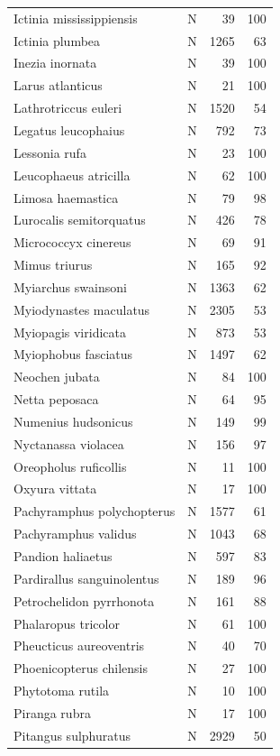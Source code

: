 \documentclass[
]{scrbook}
\begin{document}
\begin{table}
\begin{tabular}{llrr}
Ictinia mississippiensis & N & 39 & 100\\
Ictinia plumbea & N & 1265 & 63\\
\addlinespace
Inezia inornata & N & 39 & 100\\
Larus atlanticus & N & 21 & 100\\
Lathrotriccus euleri & N & 1520 & 54\\
Legatus leucophaius & N & 792 & 73\\
Lessonia rufa & N & 23 & 100\\
\addlinespace
Leucophaeus atricilla & N & 62 & 100\\
Limosa haemastica & N & 79 & 98\\
Lurocalis semitorquatus & N & 426 & 78\\
Micrococcyx cinereus & N & 69 & 91\\
Mimus triurus & N & 165 & 92\\
\addlinespace
Myiarchus swainsoni & N & 1363 & 62\\
Myiodynastes maculatus & N & 2305 & 53\\
Myiopagis viridicata & N & 873 & 53\\
Myiophobus fasciatus & N & 1497 & 62\\
Neochen jubata & N & 84 & 100\\
\addlinespace
Netta peposaca & N & 64 & 95\\
Numenius hudsonicus & N & 149 & 99\\
Nyctanassa violacea & N & 156 & 97\\
Oreopholus ruficollis & N & 11 & 100\\
Oxyura vittata & N & 17 & 100\\
\addlinespace
Pachyramphus polychopterus & N & 1577 & 61\\
Pachyramphus validus & N & 1043 & 68\\
Pandion haliaetus & N & 597 & 83\\
Pardirallus sanguinolentus & N & 189 & 96\\
Petrochelidon pyrrhonota & N & 161 & 88\\
\addlinespace
Phalaropus tricolor & N & 61 & 100\\
Pheucticus aureoventris & N & 40 & 70\\
Phoenicopterus chilensis & N & 27 & 100\\
Phytotoma rutila & N & 10 & 100\\
Piranga rubra & N & 17 & 100\\
\addlinespace
Pitangus sulphuratus & N & 2929 & 50\\

\end{tabular}
\end{table}
\end{document}
